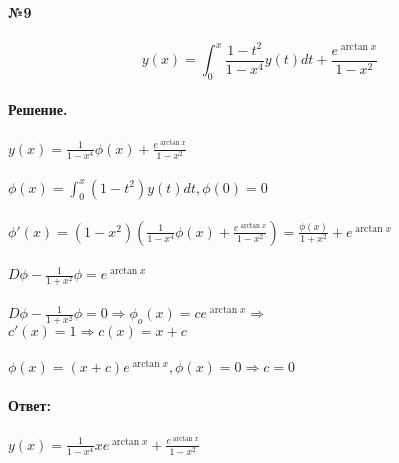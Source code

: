 \documentclass[10pt,a4paper]{article}
\begin{document}
	\noindent\textbf{№9} \\ \\
	$$y(x)=\int_0^x \frac{1-t^2}{1-x^4} y(t) dt + \frac{e^{\arctan x}}{1-x^2}$$ \\
	\textbf{Решение.}\\\\
	$y(x)=\frac{1}{1-x^4}\phi(x)+\frac{e^{\arctan x}}{1-x^2}$\\ \\
	$\phi(x)=\int_0^x (1-t^2)y(t)dt, \phi(0)=0$\\ \\
	$\phi'(x)=(1-x^2)(\frac{1}{1-x^4}\phi(x)+\frac{e^{\arctan x}}{1-x^2})=\frac{\phi(x)}{1+x^2}+e^{\arctan x}$\\ \\
	$D\phi-\frac{1}{1+x^2}\phi=e^{\arctan x}$\\ \\
	$D\phi-\frac{1}{1+x^2}\phi=0 \Rightarrow \phi_{o}(x)=c e^{\arctan x} \Rightarrow$\\ $c'(x)=1 \Rightarrow c(x)=x+c$\\ \\
	$\phi(x)=(x+c)e^{\arctan x}, \phi(x)=0 \Rightarrow c=0$\\ \\
	\textbf{Ответ:} \\ \\
	$y(x)=\frac{1}{1-x^4}x e^{\arctan x} + \frac{e^{\arctan x}}{1-x^2}$\\ \\
\end{document}
